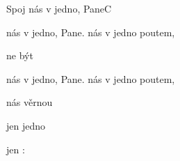 \setcounter{page}{116}
\begin{song}{Spoj nás v jedno, Pane}{C}{}
\begin{SBChorus*}
 nás v jedno, Pane.  nás v jedno poutem, 

 ne být  

 nás v jedno, Pane.   nás v jedno poutem, 

 nás věrnou   

 jen    jedno  

 jen    :
\end{SBChorus*}
\end{song}
\pagebreak
